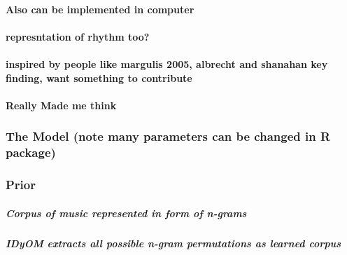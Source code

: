 \documentclass[]{book}
\let\oldparagraph\paragraph
\renewcommand{\paragraph}[1]{\oldparagraph{#1}\mbox{}}
\let\oldsubparagraph\subparagraph
\renewcommand{\subparagraph}[1]{\oldsubparagraph{#1}\mbox{}}
\theoremstyle{definition}
\theoremstyle{definition}
\theoremstyle{definition}
\theoremstyle{remark}
\begin{document}
\hypertarget{also-can-be-implemented-in-computer}{%
\paragraph{Also can be implemented in
computer}\label{also-can-be-implemented-in-computer}}

\hypertarget{represntation-of-rhythm-too}{%
\paragraph{represntation of rhythm
too?}\label{represntation-of-rhythm-too}}

\hypertarget{inspired-by-people-like-margulis-2005-albrecht-and-shanahan-key-finding-want-something-to-contribute}{%
\paragraph{inspired by people like margulis 2005, albrecht and shanahan
key finding, want something to
contribute}\label{inspired-by-people-like-margulis-2005-albrecht-and-shanahan-key-finding-want-something-to-contribute}}

\hypertarget{really-made-me-think}{%
\paragraph{Really Made me think}\label{really-made-me-think}}

\hypertarget{the-model-note-many-parameters-can-be-changed-in-r-package}{%
\subsubsection{The Model (note many parameters can be changed in R
package)}\label{the-model-note-many-parameters-can-be-changed-in-r-package}}

\hypertarget{prior}{%
\subsubsection{Prior}\label{prior}}

\hypertarget{corpus-of-music-represented-in-form-of-n-grams}{%
\subparagraph{Corpus of music represented in form of
n-grams}\label{corpus-of-music-represented-in-form-of-n-grams}}

\hypertarget{idyom-extracts-all-possible-n-gram-permutations-as-learned-corpus}{%
\subparagraph{IDyOM extracts all possible n-gram permutations as learned
corpus}\label{idyom-extracts-all-possible-n-gram-permutations-as-learned-corpus}}
\end{document}

